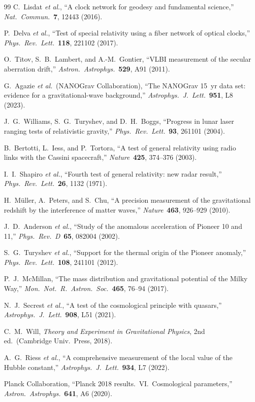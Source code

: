 \documentclass[aps,prl,twocolumn,superscriptaddress,showpacs]{revtex4-2}
\begin{document}
\begin{thebibliography}{99}
C.~Lisdat \textit{et al.}, ``A clock network for geodesy and
fundamental science,''
\textit{Nat.\ Commun.}\ \textbf{7}, 12443 (2016).

P.~Delva \textit{et al.}, ``Test of special relativity using a
fiber network of optical clocks,''
\textit{Phys.\ Rev.\ Lett.}\ \textbf{118}, 221102 (2017).

O.~Titov, S.~B.~Lambert, and A.-M.~Gontier,
``VLBI measurement of the secular aberration drift,''
\textit{Astron.\ Astrophys.}\ \textbf{529}, A91 (2011).

G.~Agazie \textit{et al.}\ (NANOGrav Collaboration),
``The NANOGrav 15~yr data set: evidence for a gravitational-wave
background,'' \textit{Astrophys.\ J.\ Lett.}\ \textbf{951}, L8 (2023).

J.~G.~Williams, S.~G.~Turyshev, and D.~H.~Boggs,
``Progress in lunar laser ranging tests of relativistic gravity,''
\textit{Phys.\ Rev.\ Lett.}\ \textbf{93}, 261101 (2004).

B.~Bertotti, L.~Iess, and P.~Tortora,
``A test of general relativity using radio links with the Cassini
spacecraft,''
\textit{Nature}\ \textbf{425}, 374--376 (2003).

I.~I.~Shapiro \textit{et al.}, ``Fourth test of general
relativity: new radar result,''
\textit{Phys.\ Rev.\ Lett.}\ \textbf{26}, 1132 (1971).

H.~M\"uller, A.~Peters, and S.~Chu,
``A precision measurement of the gravitational redshift by the
interference of matter waves,''
\textit{Nature}\ \textbf{463}, 926--929 (2010).

J.~D.~Anderson \textit{et al.}, ``Study of the anomalous
acceleration of Pioneer 10 and 11,''
\textit{Phys.\ Rev.\ D}\ \textbf{65}, 082004 (2002).

S.~G.~Turyshev \textit{et al.}, ``Support for the thermal origin
of the Pioneer anomaly,''
\textit{Phys.\ Rev.\ Lett.}\ \textbf{108}, 241101 (2012).

P.~J.~McMillan, ``The mass distribution and gravitational
potential of the Milky Way,''
\textit{Mon.\ Not.\ R.\ Astron.\ Soc.}\ \textbf{465}, 76--94 (2017).

N.~J.~Secrest \textit{et al.}, ``A test of the cosmological
principle with quasars,''
\textit{Astrophys.\ J.\ Lett.}\ \textbf{908}, L51 (2021).

C.~M.~Will, \textit{Theory and Experiment in Gravitational Physics},
2nd ed.\ (Cambridge Univ.\ Press, 2018).

A.~G.~Riess \textit{et al.}, ``A comprehensive measurement of the
local value of the Hubble constant,''
\textit{Astrophys.\ J.\ Lett.}\ \textbf{934}, L7 (2022).

Planck Collaboration, ``Planck 2018 results.\ VI.\ Cosmological
parameters,'' \textit{Astron.\ Astrophys.}\ \textbf{641}, A6 (2020).

\end{thebibliography}
\end{document}
